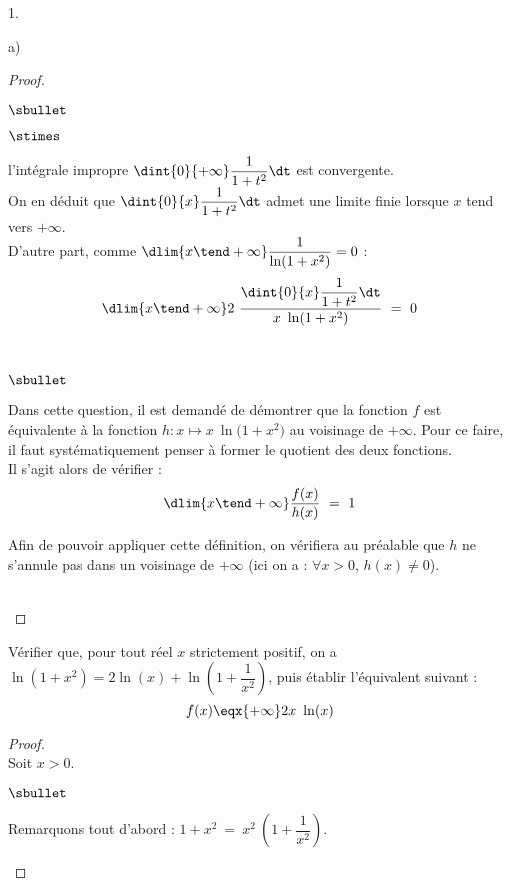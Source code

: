 \begin{noliste}{1.}
\begin{noliste}{a)}
\begin{proof}
\begin{noliste}{$\sbullet$}
\begin{noliste}{$\stimes$}
        \item l'intégrale impropre $\dint{0}{+\infty} \dfrac{1}{1 +
            t^2} \dt$ est convergente.\\
          On en déduit que $\dint{0}{x} \dfrac{1}{1 + t^2} \dt$ admet
          une limite finie lorsque $x$ tend vers $+\infty$.\\
          D'autre part, comme $\dlim{x \tend +\infty} \dfrac{1}{\ln(1
            + x^2)} = 0$ :
          \[
          \dlim{x \tend +\infty} 2 \ \dfrac{\dint{0}{x} \dfrac{1}{1 +
              t^2} \dt}{x \ \ln(1 + x^2)} \ = \ 0
          \]
        \end{noliste}
      \end{noliste}
      ~\\[-.8cm]


      \newpage


      \begin{remark}%
        \begin{noliste}{$\sbullet$}
        \item Dans cette question, il est demandé de démontrer que la
          fonction $f$ est équivalente à la fonction $h : x \mapsto x
          \ \ln\big( 1 + x^2 \big)$ au voisinage de $+\infty$. Pour ce
          faire, il faut systématiquement penser à former le quotient
          des deux fonctions.\\
          Il s'agit alors de vérifier :
          \[
          \dlim{x \tend +\infty} \dfrac{f(x)}{h(x)} \ = \ 1
          \]
        \item Afin de pouvoir appliquer cette définition, on vérifiera
          au préalable que $h$ ne s'annule pas dans un voisinage de
          $+\infty$ (ici on a : $\forall x > 0$, $h(x) \neq 0$).
        \end{noliste}
      \end{remark}~\\[-1.5cm]
    \end{proof}
    
  \item Vérifier que, pour tout réel $x$ strictement positif, on a
    $\ln(1 + x^2) = 2 \ln(x) + \ln \left( 1 + \dfrac{1}{x^2} \right)$,
    puis établir l'équivalent suivant :
    \[
    f(x) \eqx{+\infty} 2x \ \ln(x)
    \]

    \begin{proof}~\\%
      Soit $x > 0$.
      \begin{noliste}{$\sbullet$}
      \item Remarquons tout d'abord : $1 + x^2 \ = \ x^2 \ \left(1 +
          \dfrac{1}{x^2} \right)$.


\end{noliste}
\end{proof}
\end{noliste}
\end{noliste}
